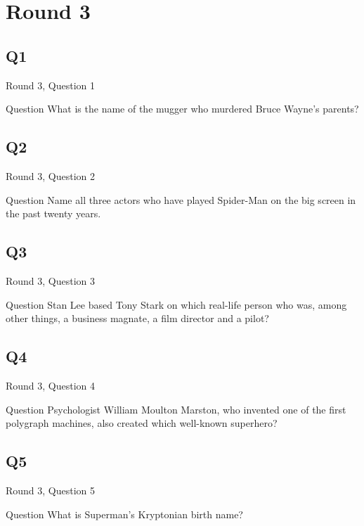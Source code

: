 \documentclass[11pt]{beamer}
\begin{document}
\section{Round 3}
\subsection*{Q1}
\begin{frame}[t]{Round 3, Question 1}
\begin{block}{Question}
What is the name of the mugger who murdered Bruce Wayne's parents?
\end{block}
\end{frame}
\subsection*{Q2}
\begin{frame}[t]{Round 3, Question 2}
\begin{block}{Question}
Name all three actors who have played Spider-Man on the big screen in the past twenty years.
\end{block}
\end{frame}
\subsection*{Q3}
\begin{frame}[t]{Round 3, Question 3}
\begin{block}{Question}
Stan Lee based Tony Stark on which real-life person who was, among other things, a business magnate, a film director and a pilot?
\end{block}
\end{frame}
\subsection*{Q4}
\begin{frame}[t]{Round 3, Question 4}
\begin{block}{Question}
Psychologist William Moulton Marston, who invented one of the first polygraph machines, also created which well-known superhero?
\end{block}
\end{frame}
\subsection*{Q5}
\begin{frame}[t]{Round 3, Question 5}
\begin{block}{Question}
What is Superman's Kryptonian birth name?
\end{block}
\end{frame}
\end{document}

